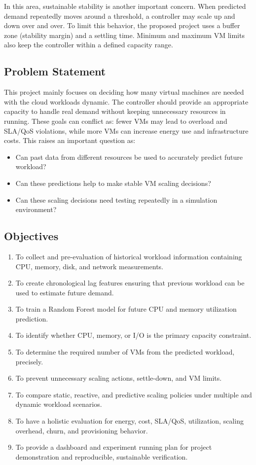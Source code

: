 \documentclass[10pt,journal,compsoc]{IEEEtran}
\begin{document}
In this area, sustainable stability is another important concern. When predicted demand repeatedly moves around a threshold, a controller may scale up and down over and over. To limit this behavior, the proposed project uses a buffer zone (stability margin) and a settling time. Minimum and maximum VM limits also keep the controller within a defined capacity range.

\subsection{Problem Statement}
This project mainly focuses on deciding how many virtual machines are needed with the cloud workloads dynamic. The controller should provide an appropriate capacity to handle real demand without keeping unnecessary resources in running. These goals can conflict as: fewer VMs may lead to overload and SLA/QoS violations, while more VMs can increase energy use and infrastructure costs. This raises an important question as:
\begin{itemize}
    \item Can past data from different resources be used to accurately predict future workload?
    \item Can these predictions help to make stable VM scaling decisions?
    \item Can these scaling decisions need testing repeatedly in a simulation environment?
\end{itemize}

\subsection{Objectives}
\begin{enumerate}
    \item To collect and pre-evaluation of historical workload information containing CPU, memory, disk, and network measurements.
    \item To create chronological lag features ensuring that previous workload can be used to estimate future demand.
    \item To train a Random Forest model for future CPU and memory utilization prediction.
    \item To identify whether CPU, memory, or I/O is the primary capacity constraint.
    \item To determine the required number of VMs from the predicted workload, precisely.
    \item To prevent unnecessary scaling actions, settle-down, and VM limits.
    \item To compare static, reactive, and predictive scaling policies under multiple and dynamic workload scenarios.
    \item To have a holistic evaluation for energy, cost, SLA/QoS, utilization, scaling overhead, churn, and provisioning behavior.
    \item To provide a dashboard and experiment running plan for project demonstration and reproducible, sustainable verification.
\end{enumerate}
\end{document}
